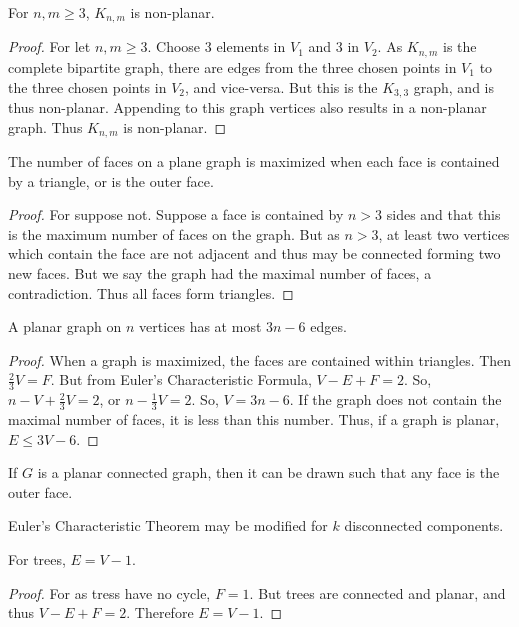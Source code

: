 \documentclass[crop=false,class=book]{standalone}
\begin{document}
\begin{theorem}
For $n,m\geq 3$, $K_{n,m}$ is non-planar.
\end{theorem}
\begin{proof}
For let $n,m\geq 3$. Choose $3$ elements in $V_1$ and $3$ in $V_2$. As $K_{n,m}$ is the complete bipartite graph, there are edges from the three chosen points in $V_1$ to the three chosen points in $V_2$, and vice-versa. But this is the $K_{3,3}$ graph, and is thus non-planar. Appending to this graph vertices also results in a non-planar graph. Thus $K_{n,m}$ is non-planar.
\end{proof}
\begin{lemma}
The number of faces on a plane graph is maximized when each face is contained by a triangle, or is the outer face.
\end{lemma}
\begin{proof}
For suppose not. Suppose a face is contained by $n>3$ sides and that this is the maximum number of faces on the graph. But as $n>3$, at least two vertices which contain the face are not adjacent and thus may be connected forming two new faces. But we say the graph had the maximal number of faces, a contradiction. Thus all faces form triangles.
\end{proof}
\begin{theorem}
A planar graph on $n$ vertices has at most $3n-6$ edges.
\end{theorem}
\begin{proof}
When a graph is maximized, the faces are contained within triangles. Then $\frac{2}{3}V= F$. But from Euler's Characteristic Formula, $V-E+F=2$. So, $n-V+\frac{2}{3}V = 2$, or $n-\frac{1}{3}V = 2$. So, $V=3n-6$. If the graph does not contain the maximal number of faces, it is less than this number. Thus, if a graph is planar, $E\leq 3V-6$.
\end{proof}
\begin{theorem}
If $G$ is a planar connected graph, then it can be drawn such that any face is the outer face.
\end{theorem}
\begin{theorem}
Euler's Characteristic Theorem may be modified for $k$ disconnected components.
\end{theorem}
\begin{corollary}
For trees, $E=V-1$.
\end{corollary}
\begin{proof}
For as tress have no cycle, $F=1$. But trees are connected and planar, and thus $V-E+F = 2$. Therefore $E=V-1$.
\end{proof}
\end{document}

